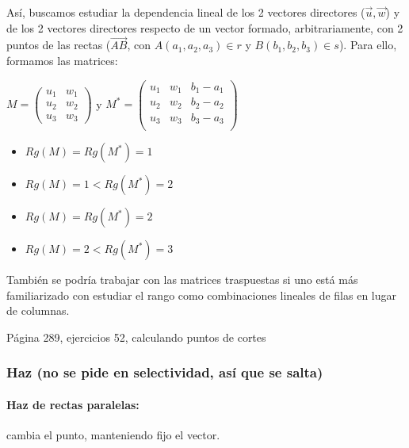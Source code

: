 Así, buscamos estudiar la dependencia lineal de los 2 vectores directores ($\vec{u},\vec{w}$) y de los 2 vectores directores respecto de un vector formado, arbitrariamente, con 2 puntos de las rectas ($\vec{AB}$, con $A(a_1,a_2,a_3)\in r$ y $B(b_1,b_2,b_3)\in s$). 
%
Para ello, formamos las matrices:

$M  = \displaystyle\begin{pmatrix}
u_1&w_1\\
u_2&w_2\\
u_3&w_3
\end{pmatrix}
$ y 
$M^* = \displaystyle\begin{pmatrix}
u_1&w_1&b_1-a_1\\
u_2&w_2&b_2-a_2\\
u_3&w_3&b_3-a_3\\
\end{pmatrix}
$

\begin{framed}
  \begin{itemize}
    \item $Rg(M) = Rg(M^*) = 1 $
    \item $Rg(M) = 1 < Rg(M^*) = 2 $ 
    \item $Rg(M) = Rg(M^*) = 2 $
    \item $Rg(M) = 2 < Rg(M^*) = 3 $ 
  \end{itemize}  
\end{framed}
\obs También se podría trabajar con las matrices traspuestas si uno está más familiarizado con estudiar el rango como combinaciones lineales de filas en lugar de columnas.

\begin{problem}
Página 289, ejercicios 52, calculando puntos de cortes
\solution

\end{problem}


\subsubsection{Haz (no se pide en selectividad, así que se salta)}
\paragraph{Haz de rectas paralelas: } cambia el punto, manteniendo fijo el vector. 
